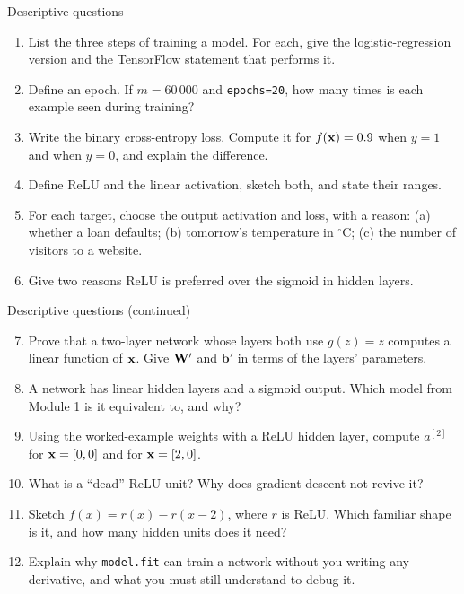 \documentclass[aspectratio=169,10pt]{beamer}
\begin{document}
\begin{frame}{Descriptive questions}
  \footnotesize
  \begin{enumerate}
    \item List the three steps of training a model. For each, give the logistic-regression
          version and the TensorFlow statement that performs it. \hfill{}
    \item Define an epoch. If $m=60\,000$ and \texttt{epochs=20}, how many times is each
          example seen during training? \hfill{}
    \item Write the binary cross-entropy loss. Compute it for $f(\mathbf{x})=0.9$ when $y=1$ and
          when $y=0$, and explain the difference. \hfill{}
    \item Define ReLU and the linear activation, sketch both, and state their ranges.
          \hfill{}
    \item For each target, choose the output activation and loss, with a reason: (a) whether
          a loan defaults; (b) tomorrow's temperature in $^\circ$C; (c) the number of
          visitors to a website. \hfill{}
    \item Give two reasons ReLU is preferred over the sigmoid in hidden layers.
          \hfill{}
  \end{enumerate}
\end{frame}

\begin{frame}{Descriptive questions (continued)}
  \footnotesize
  \begin{enumerate}\setcounter{enumi}{6}
    \item Prove that a two-layer network whose layers both use $g(z)=z$ computes a linear
          function of $\mathbf{x}$. Give $\mathbf{W}'$ and $\mathbf{b}'$ in terms of the layers'
          parameters. \hfill{}
    \item A network has linear hidden layers and a sigmoid output. Which model from
          Module 1 is it equivalent to, and why? \hfill{}
    \item Using the worked-example weights with a ReLU hidden layer, compute $a^{[2]}$ for
          $\mathbf{x}=[0,0]$ and for $\mathbf{x}=[2,0]$. \hfill{}
    \item What is a ``dead'' ReLU unit? Why does gradient descent not revive it?
          \hfill{}
    \item Sketch $f(x)=r(x)-r(x-2)$, where $r$ is ReLU. Which familiar shape is it, and
          how many hidden units does it need? \hfill{}
    \item Explain why \texttt{model.fit} can train a network without you writing any
          derivative, and what you must still understand to debug it. \hfill{}
  \end{enumerate}
\end{frame}
\end{document}
